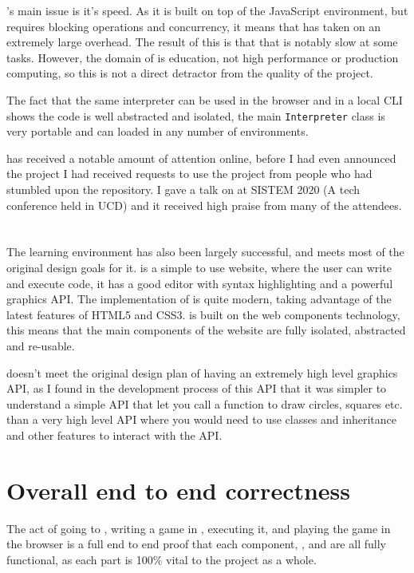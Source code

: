 \Setanta{}'s main issue is it's speed. As it is built on top of the JavaScript environment, but requires blocking operations and concurrency, it means that \Setanta{} has taken on an extremely large overhead. The result of this is that that \Setanta{} is notably slow at some tasks. However, the domain of \Setanta{} is education, not high performance or production computing, so this is not a direct detractor from the quality of the project.

The fact that the same \Setanta{} interpreter can be used in the browser and in a local CLI shows the code is well abstracted and isolated, the main \lstinline|Interpreter| class is very portable and can loaded in any number of environments.

\Setanta{} has received a notable amount of attention online, before I had even announced the project I had received requests to use the project from people who had stumbled upon the repository. I gave a talk on \Setanta{} at SISTEM 2020 (A tech conference held in UCD) and it received high praise from many of the attendees.

\section{\trys{}}

The \trys{} learning environment has also been largely successful, and meets most of the original design goals for it. \trys{} is a simple to use website, where the user can write and execute \Setanta{} code, it has a good editor with syntax highlighting and a powerful graphics API.
The implementation of \trys{} is quite modern, taking advantage of the latest features of HTML5 and CSS3. \trys{} is built on the web components technology, this means that the main components of the \trys{} website are fully isolated, abstracted and re-usable.

\trys{} doesn't meet the original design plan of having an extremely high level graphics API, as I found in the development process of this API that it was simpler to understand a simple API that let you call a function to draw circles, squares etc. than a very high level API where you would need to use classes and inheritance and other features to interact with the API.

\section{Overall end to end correctness}

The act of going to \trys{}, writing a game in \Setanta{}, executing it, and playing the game in the browser is a full end to end proof that each component, \trys{}, \Setanta{} and \tsPEG{} are all fully functional, as each part is 100\% vital to the project as a whole.

